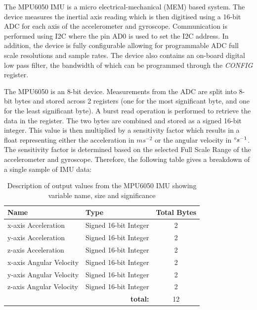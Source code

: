 The MPU6050 IMU is a micro electrical-mechanical (MEM) based system. The device measures the inertial axis reading which is then digitised using a 16-bit ADC for each axis of the accelerometer and gyroscope. Communication is performed using I2C where the pin AD0 is used to set the I2C address. In addition, the device is fully configurable allowing for programmable ADC full scale resolutions and sample rates. The device also contains an on-board digital low pass filter, the bandwidth of which can be programmed through the \textit{CONFIG} register.\par 
The MPU6050 is an 8-bit device. Measurements from the ADC are split into 8-bit bytes and stored across 2 registers (one for the most significant byte, and one for the least significant byte). A burst read operation is performed to retrieve the data in the register. The two bytes are combined and stored as a signed 16-bit integer. This value is then multiplied by a sensitivity factor which results in a float representing either the acceleration in $ms^{-2}$ or the angular velocity in $\degree s^{-1}$. The sensitivity factor is determined based on the selected Full Scale Range of the accelerometer and gyroscope. Therefore, the following table gives a breakdown of a single sample of IMU data:

\begin{table}[H]
    \centering
    \caption{Description of output values from the MPU6050 IMU showing variable name, size and significance}
    \begin{tabular}{|l|l|c|}
    \hline
    \textbf{Name} & \textbf{Type} &\textbf{Total Bytes} \\
    \hline
     x-axis Acceleration & Signed 16-bit Integer & 2\\
     \hline
      y-axis Acceleration & Signed 16-bit Integer & 2\\
     \hline
      z-axis Acceleration & Signed 16-bit Integer & 2\\
     \hline
     x-axis Angular Velocity & Signed 16-bit Integer & 2\\
     \hline
     y-axis Angular Velocity & Signed 16-bit Integer & 2\\
     \hline
     z-axis Angular Velocity & Signed 16-bit Integer & 2\\
     \hline
     \multicolumn{2}{r}{\textbf{total:}} &\multicolumn{1}{c}{12}\\
     \cline{3-3}
     \cline{3-3}
    \end{tabular}

    \label{tab:IMU_data_outl}
\end{table}

